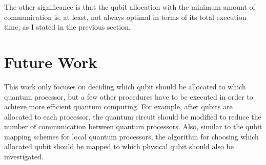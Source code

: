  The other significance is that the qubit allocation with the minimum amount of communication is, at least, not always optimal in terms of its total execution time, as I stated in the previous section.
 
 \section{Future Work}
 
 This work only focuses on deciding which qubit should be allocated to which quantum processor, but a few other procedures have to be executed in order to achieve more efficient quantum computing.  For example, after qubits are allocated to each processor, the quantum circuit should be modified to reduce the number of  communication between quantum processors.  Also, similar to the qubit mapping schemes for local quantum processors, the algorithm for choosing which allocated qubit should be mapped to which physical qubit should also be investigated.



